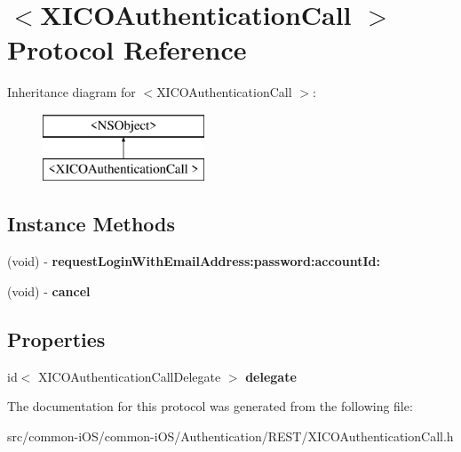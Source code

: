 \hypertarget{protocol_x_i_c_o_authentication_call_01-p}{}\section{$<$X\+I\+C\+O\+Authentication\+Call $>$ Protocol Reference}
\label{protocol_x_i_c_o_authentication_call_01-p}
Inheritance diagram for $<$X\+I\+C\+O\+Authentication\+Call $>$\+:\begin{figure}[H]
\begin{center}
\leavevmode
\includegraphics[height=2.000000cm]{protocol_x_i_c_o_authentication_call_01-p}
\end{center}
\end{figure}
\subsection*{Instance Methods}
\begin{DoxyCompactItemize}
\item 
\hypertarget{protocol_x_i_c_o_authentication_call_01-p_a59315e2400335dd75535410954346e1b}{}\label{protocol_x_i_c_o_authentication_call_01-p_a59315e2400335dd75535410954346e1b} 
(void) -\/ {\bfseries request\+Login\+With\+Email\+Address\+:password\+:account\+Id\+:}
\item 
\hypertarget{protocol_x_i_c_o_authentication_call_01-p_a46ae1eaae19a6f8a3ddc7d90134628cd}{}\label{protocol_x_i_c_o_authentication_call_01-p_a46ae1eaae19a6f8a3ddc7d90134628cd} 
(void) -\/ {\bfseries cancel}
\end{DoxyCompactItemize}
\subsection*{Properties}
\begin{DoxyCompactItemize}
\item 
\hypertarget{protocol_x_i_c_o_authentication_call_01-p_a6623394aff26e7ab357a853e427e988b}{}\label{protocol_x_i_c_o_authentication_call_01-p_a6623394aff26e7ab357a853e427e988b} 
id$<$ X\+I\+C\+O\+Authentication\+Call\+Delegate $>$ {\bfseries delegate}
\end{DoxyCompactItemize}


The documentation for this protocol was generated from the following file\+:\begin{DoxyCompactItemize}
\item 
src/common-\/i\+O\+S/common-\/i\+O\+S/\+Authentication/\+R\+E\+S\+T/X\+I\+C\+O\+Authentication\+Call.\+h\end{DoxyCompactItemize}
